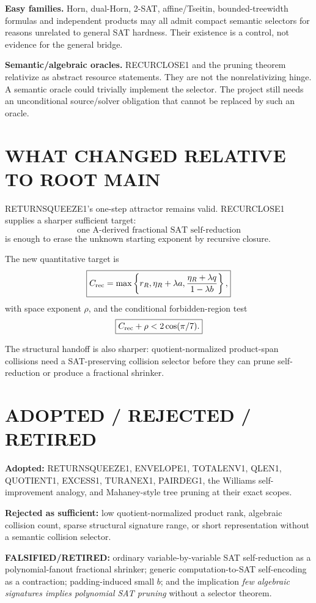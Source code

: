 \documentclass[11pt]{article}
\begin{document}
\textbf{Easy families.}
Horn, dual-Horn, 2-SAT, affine/Tseitin, bounded-treewidth formulas and independent products may all admit compact semantic selectors for reasons unrelated to general SAT hardness. Their existence is a control, not evidence for the general bridge.

\textbf{Semantic/algebraic oracles.}
RECURCLOSE1 and the pruning theorem relativize as abstract resource statements. They are not the nonrelativizing hinge. A semantic oracle could trivially implement the selector. The project still needs an unconditional source/solver obligation that cannot be replaced by such an oracle.

\section*{WHAT CHANGED RELATIVE TO ROOT MAIN}
RETURNSQUEEZE1's one-step attractor remains valid. RECURCLOSE1 supplies a sharper sufficient target:
\[
\text{one A-derived fractional SAT self-reduction}
\]
is enough to erase the unknown starting exponent by recursive closure.

The new quantitative target is
\[
\boxed{
C_{\rm rec}
=
\max\left\{
r_R,\eta_R+\lambda a,
\frac{\eta_R+\lambda q}{1-\lambda b}
\right\},
}
\]
with space exponent \(\rho\), and the conditional forbidden-region test
\[
\boxed{
C_{\rm rec}+\rho<2\cos(\pi/7).
}
\]

The structural handoff is also sharper: quotient-normalized product-span collisions need a SAT-preserving collision selector before they can prune self-reduction or produce a fractional shrinker.

\section*{ADOPTED / REJECTED / RETIRED}
\textbf{Adopted:} RETURNSQUEEZE1, ENVELOPE1, TOTALENV1, QLEN1, QUOTIENT1, EXCESS1, TURANEX1, PAIRDEG1, the Williams self-improvement analogy, and Mahaney-style tree pruning at their exact scopes.

\textbf{Rejected as sufficient:} low quotient-normalized product rank, algebraic collision count, sparse structural signature range, or short representation without a semantic collision selector.

\textbf{FALSIFIED/RETIRED:} ordinary variable-by-variable SAT self-reduction as a polynomial-fanout fractional shrinker; generic computation-to-SAT self-encoding as a contraction; padding-induced small \(b\); and the implication \emph{few algebraic signatures implies polynomial SAT pruning} without a selector theorem.
\end{document}
